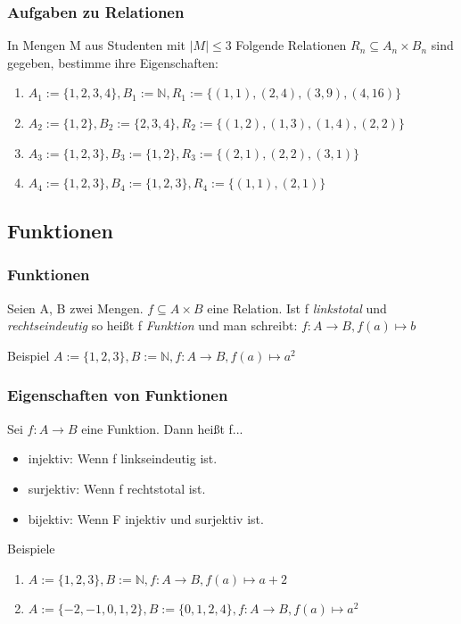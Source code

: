 \documentclass{beamer}
\begin{document}
\begin{frame}
  \frametitle{Aufgaben zu Relationen}
  \begin{exampleblock}{In Mengen M aus Studenten mit $|M| \leq 3$}
      Folgende Relationen $R_n \subseteq A_n \times B_n$ sind gegeben, bestimme ihre Eigenschaften:
      \begin{enumerate}
        \item $A_1 := \{1, 2, 3, 4\}, B_1 := \mathbb{N}, R_1 := \{(1, 1), (2, 4), (3, 9), (4, 16)\}$
        \item $A_2 := \{1, 2\}, B_2 := \{2, 3, 4\}, R_2 := \{(1, 2), (1, 3), (1, 4), (2, 2)\}$
        \item $A_3 := \{1, 2, 3\}, B_3 := \{1, 2\}, R_3 := \{(2, 1), (2, 2), (3, 1)\}$
        \item $A_4 := \{1, 2, 3\}, B_4 := \{1, 2, 3\}, R_4 := \{(1, 1), (2, 1)\}$
      \end{enumerate}
  \end{exampleblock}
\end{frame}
\subsection{Funktionen}
\begin{frame}
  \frametitle{Funktionen}
  \begin{definition}
  	Seien A, B zwei Mengen. $f \subseteq A \times B$ eine Relation. Ist f \emph{linkstotal} und \emph{rechtseindeutig} so heißt f \emph{Funktion} und man schreibt:
  	$f: A \rightarrow B, f(a) \mapsto b$
  \end{definition} \pause
  \begin{exampleblock}{Beispiel}
      $A := \{1, 2, 3\}, B := \mathbb{N}, f: A \rightarrow B, f(a) \mapsto a^2$
  \end{exampleblock}
\end{frame}
\begin{frame}
  \frametitle{Eigenschaften von Funktionen}
  \begin{definition}
  	Sei $f: A \rightarrow B$ eine Funktion. Dann heißt f...
  	\begin{itemize}
  	  \item injektiv: Wenn f linkseindeutig ist.
  	  \item surjektiv: Wenn f rechtstotal ist.
  	  \item bijektiv: Wenn F injektiv und surjektiv ist.
  	\end{itemize}
  \end{definition} \pause
  \begin{exampleblock}{Beispiele}
    \begin{enumerate}
      \item $A := \{1, 2, 3\}, B := \mathbb{N}, f: A \rightarrow B, f(a) \mapsto a+2$
      \item $A := \{-2, -1, 0, 1, 2\}, B := \{0, 1, 2, 4\}, f: A \rightarrow B, f(a) \mapsto a^2$
    \end{enumerate}
  \end{exampleblock}
\end{frame}
\end{document}
